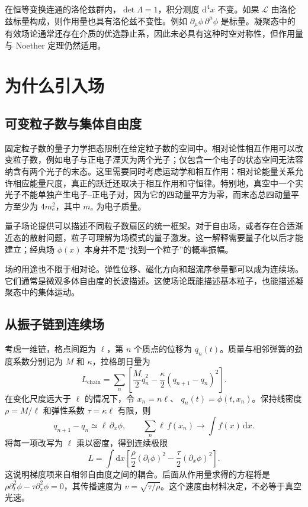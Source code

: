 在恒等变换连通的洛伦兹群内，$\det\Lambda=1$，积分测度 $\mathrm{d}^{4}x$ 不变。如果 $\mathcal{L}$ 由洛伦兹标量构成，则作用量也具有洛伦兹不变性。例如 $\partial_{\mu}\phi\,\partial^{\mu}\phi$ 是标量。凝聚态中的有效场论通常还存在介质的优选静止系，因此未必具有这种时空对称性，但作用量与 Noether 定理仍然适用。

\section{为什么引入场}
\label{sec:prelude-why-fields}

\subsection{可变粒子数与集体自由度}

固定粒子数的量子力学把态限制在给定粒子数的空间中。相对论性相互作用可以改变粒子数，例如电子与正电子湮灭为两个光子；仅包含一个电子的状态空间无法容纳含有两个光子的末态。这里需要同时考虑运动学和相互作用：相对论能量关系允许相应能量尺度，真正的跃迁还取决于相互作用和守恒律。特别地，真空中一个实光子不能单独产生电子--正电子对，因为它的四动量平方为零，而末态总四动量平方至少为 $4m_{\mathrm{e}}^{2}$，其中 $m_{\mathrm{e}}$ 为电子质量。

量子场论提供可以描述不同粒子数扇区的统一框架。对于自由场，或者存在合适渐近态的散射问题，粒子可理解为场模式的量子激发。这一解释需要量子化以后才能建立；经典场 $\phi(x)$ 本身并不是“找到一个粒子”的概率振幅。

场的用途也不限于相对论。弹性位移、磁化方向和超流序参量都可以成为连续场。它们通常是微观多体自由度的长波描述。这使场论既能描述基本粒子，也能描述凝聚态中的集体运动。

\subsection{从振子链到连续场}

考虑一维链，格点间距为 $\ell$，第 $n$ 个质点的位移为 $q_{n}(t)$。质量与相邻弹簧的劲度系数分别记为 $M$ 和 $\kappa$，拉格朗日量为
\begin{equation}
  L_{\mathrm{chain}}=\sum_{n}\left[
    \frac{M}{2}\dot q_{n}^{2}
    -\frac{\kappa}{2}(q_{n+1}-q_{n})^{2}\right].
\end{equation}
在变化尺度远大于 $\ell$ 的情况下，令 $x_{n}=n\ell$、
$q_{n}(t)=\phi(t,x_{n})$。保持线密度 $\rho=M/\ell$ 和弹性系数
$\tau=\kappa\ell$ 有限，则
\begin{equation}
  q_{n+1}-q_{n}\simeq\ell\,\partial_{x}\phi,
  \qquad \sum_{n}\ell\,f(x_{n})\longrightarrow\int f(x)\,\mathrm{d}x.
\end{equation}
将每一项改写为 $\ell$ 乘以密度，得到连续极限
\begin{equation}
  L=\int\mathrm{d}x\left[
    \frac{\rho}{2}(\partial_{t}\phi)^{2}
    -\frac{\tau}{2}(\partial_{x}\phi)^{2}\right].
  \label{eq:prelude-chain-continuum}
\end{equation}
这说明梯度项来自相邻自由度之间的耦合。后面从作用量求得的方程将是
$\rho\partial_{t}^{2}\phi-\tau\partial_{x}^{2}\phi=0$，其传播速度为
$v=\sqrt{\tau/\rho}$。这个速度由材料决定，不必等于真空光速。


